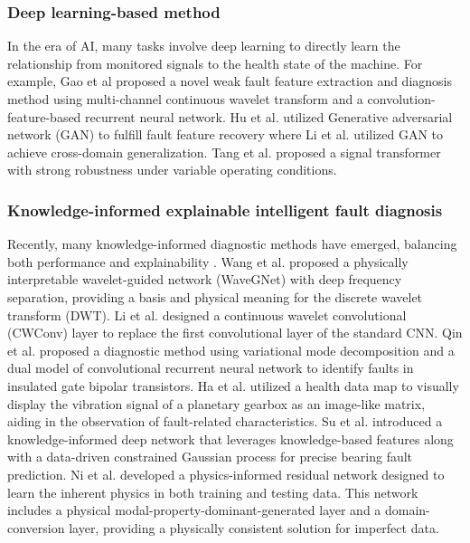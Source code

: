 \documentclass[lettersize,journal]{IEEEtran}
\begin{document}
\subsubsection{Deep learning-based method}
In the era of AI, many tasks involve deep learning to directly learn the relationship from monitored signals to the health state of the machine. For example, Gao et al \cite{Gao2021} proposed a novel weak fault feature extraction and diagnosis method using multi-channel continuous wavelet transform and a convolution-feature-based recurrent neural network. Hu et al. \cite{Hu2022} utilized Generative adversarial network (GAN) to fulfill fault feature recovery where Li et al. \cite{Li2023} utilized GAN to achieve cross-domain generalization. Tang et al. \cite{Tang2022} proposed a signal transformer with strong robustness under variable operating conditions.

\subsubsection{Knowledge-informed explainable intelligent fault diagnosis}
Recently, many knowledge-informed diagnostic methods have emerged, balancing both performance and explainability \cite{deng_physics-informed_2023}. Wang et al. \cite{wangPhysicallyInterpretableWaveletguided2024} proposed a physically interpretable wavelet-guided network (WaveGNet) with deep frequency separation, providing a basis and physical meaning for the discrete wavelet transform (DWT). Li et al. \cite{liWaveletKernelNetInterpretableDeep2020a} designed a continuous wavelet convolutional (CWConv) layer to replace the first convolutional layer of the standard CNN. Qin et al. \cite{qin_vwm-dcrnn_2023} proposed a diagnostic method using variational mode decomposition and a dual model of convolutional recurrent neural network to identify faults in insulated gate bipolar transistors. Ha et al. \cite{ha_domain_2023} utilized a health data map to visually display the vibration signal of a planetary gearbox as an image-like matrix, aiding in the observation of fault-related characteristics. Su et al. \cite{su_knowledge-informed_2024} introduced a knowledge-informed deep network that leverages knowledge-based features along with a data-driven constrained Gaussian process for precise bearing fault prediction. Ni et al. \cite{ni_physics-informed_2023} developed a physics-informed residual network designed to learn the inherent physics in both training and testing data. This network includes a physical modal-property-dominant-generated layer and a domain-conversion layer, providing a physically consistent solution for imperfect data.
\end{document}
